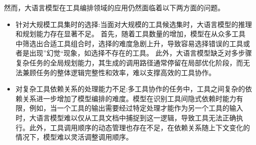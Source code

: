 然而，大语言模型在工具编排领域的应用仍然面临着以下两方面的问题。


\begin{itemize}
    \item 针对大规模工具集时的选择:当面对大规模的工具候选集时，大语言模型的推理和规划能力存在显著不足。
    首先，随着工具数量的增加，模型在从众多工具中筛选出合适工具组合时，选择的难度急剧上升，导致容易选择错误的工具或者是出现”幻觉“现象，如选择不存在的工具。
    此外，大语言模型缺乏对多步骤复杂任务的全局规划能力，其生成的调用路径通常停留在局部优化阶段，而无法兼顾任务的整体逻辑完整性和效率，难以支撑高效的工具协作。
    \item 对复杂工具依赖关系的处理能力不足:多工具协作的任务中，工具之间复杂的依赖关系进一步增加了模型编排的难度。模型在识别工具间隐式依赖时能力有限，例如，当一个工具的输出需要经过特定处理才能作为另一个工具的输入时，大语言模型难以仅从工具文档中捕捉到这一逻辑，导致工具无法正确执行。此外，工具调用顺序的动态管理也存在不足，在依赖关系随上下文变化的情况下，模型难以灵活调整调用顺序。
\end{itemize}


% 
% 
% 

